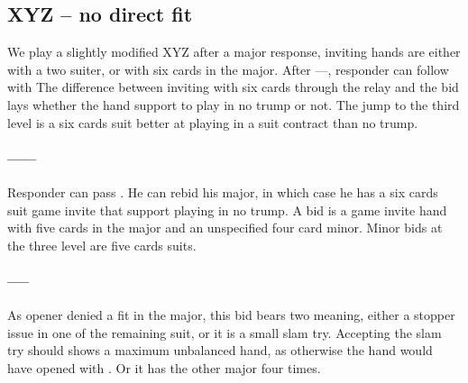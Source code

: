 \subsection{XYZ – no direct fit}
We play a slightly modified XYZ after a major response, inviting hands are either with a two suiter, or with six cards in the major. After \bid{1\DS}––\bid{1\NT}, responder can follow with
The difference between inviting with six cards through the \bid{2\CS} relay and the  bid lays whether the hand support to play in no trump or not. The jump to the third level is a six cards suit better at playing in a suit contract than no trump.
\paragraph{\bid{1\DS}–––\bid{2\CS}–\bid{2\DS}}
Responder can pass \bid{2\DS}. He can rebid his major, in which case he has a six cards suit game invite that support playing in no trump. A \bid{2\NT} bid is a game invite hand with five cards in the major and an unspecified four card minor. Minor bids at the three level are five cards suits.
\paragraph{\bid{1\DS}–––\bid{2\NT}}
As opener denied a fit in the major, this bid bears two meaning, either a stopper issue in one of the remaining suit, or it is a small slam try.
Accepting the slam try should shows a maximum unbalanced hand, as otherwise the hand would have opened with \bid{1\NT}. Or it has the other major four times.
